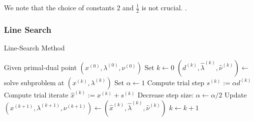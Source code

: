 We note that the choice of constants $2$ and $\frac{1}{2}$ is not crucial. .

\subsubsection{Line Search}

\begin{algorithm}[h!]
\caption{Line-Search Method}
\SetAlgoVlined
Given primal-dual point $(x^{(0)}, \lambda^{(0)}, \nu^{(0)})$ \;
Set $k \gets 0$ \;
 {
	$(d^{(k)}, \hat{\lambda}^{(k)}, \hat{\nu}^{(k)}) \gets$ solve subproblem at $(x^{(k)}, \lambda^{(k)})$ \;
	Set $\alpha \gets 1$ \;
	 {
		Compute trial step $s^{(k)} := \alpha d^{(k)}$ \;
		Compute trial iterate $\hat{x}^{(k)} := x^{(k)} + s^{(k)}$ \;
		 {
			Decrease step size: $\alpha \gets \alpha/2$ \;
		}
	}
	Update $(x^{(k+1)}, \lambda^{(k+1)}, \nu^{(k+1)}) \gets (\hat{x}^{(k)}, \hat{\lambda}^{(k)}, \hat{\nu}^{(k)})$ \;
	$k \gets k+1$ \;
}
\end{algorithm}

\clearpage
